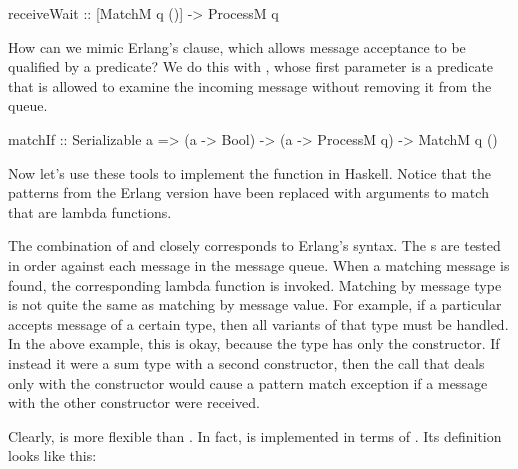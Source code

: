 \documentclass[preprint]{sigplanconf}
\begin{document}
\begin{code}
receiveWait :: [MatchM q ()] -> ProcessM q
\end{code}

How can we mimic Erlang's  clause, which allows message acceptance to be qualified by a predicate? 
We do this with , whose first parameter is a predicate that is allowed to examine the incoming message without removing it from the queue.

\begin{code}
matchIf :: Serializable a => (a -> Bool) -> 
								(a -> ProcessM q) -> MatchM q ()
\end{code}

Now let's use these tools to implement the  function in Haskell. 
Notice that the patterns from the Erlang version have been replaced with arguments to match that are lambda functions.

\needspace{14ex}

The combination of  and  closely corresponds to Erlang's  syntax. The s are tested in order against each message in the message queue. When a matching message is found, the corresponding lambda function is invoked. 
Matching by message type is not quite the same as matching by message value. For example, if a particular  accepts message of a certain type, then all variants of that type must be handled. In the above example, this is okay, because the  type has only the  constructor. 
If instead it were a sum type with a second constructor, then the  call that deals only with the  constructor would cause a pattern match exception if a message with the other constructor were received.

Clearly,  is more flexible than . In fact,  is implemented in terms of . Its definition looks like this:
\end{document}
